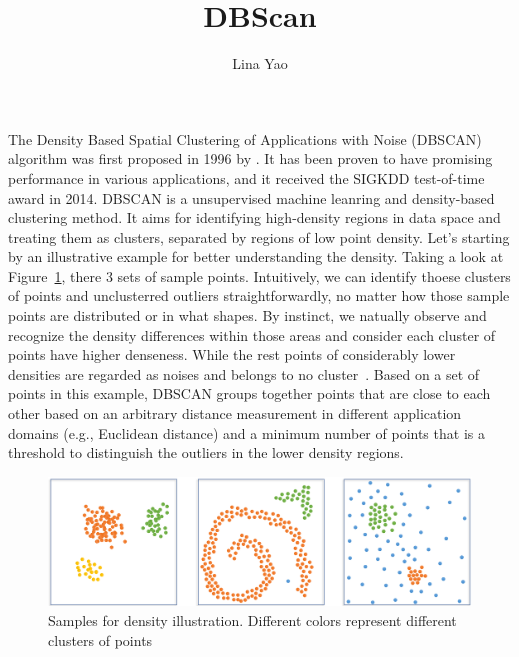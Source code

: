 \title{DBScan}
\label{chp:dbscan}
\author{Lina Yao}
\maketitle


The Density Based Spatial Clustering of Applications with Noise (DBSCAN) 
algorithm was first proposed in 1996 by \cite{ester1996density}. It has been 
proven to have promising performance in various applications, and it received 
the SIGKDD test-of-time award in 2014.  DBSCAN is a unsupervised machine leanring and density-based clustering method. 
It aims for identifying high-density regions in data space and treating them as 
clusters, separated by regions of low point density. Let's starting by an 
illustrative example for better understanding the density. Taking a look at Figure~\ref{fig:example}, there 3 sets of sample points. Intuitively, we can identify thoese clusters of points and unclusterred outliers straightforwardly, no matter how those sample points are distributed or in what shapes. By instinct, we natually observe and recognize the density differences within those areas and consider each cluster of points have higher denseness. While the rest points of considerably lower densities are regarded as noises and belongs to no cluster~\cite{ester1996density}. Based on a set of points in this 
example, DBSCAN groups together points that are close to each other based on an 
arbitrary distance measurement in different application domains 
(e.g., Euclidean distance) and a minimum number of points that is a threshold to 
distinguish the outliers in the lower density regions. 


\begin{figure}[tbp]
	\centering
	\label{fig:example}
	\includegraphics[width=\textwidth]{"figures/example_density.png"}
	\caption{Samples for density illustration. Different colors represent different clusters of points}
\end{figure}


